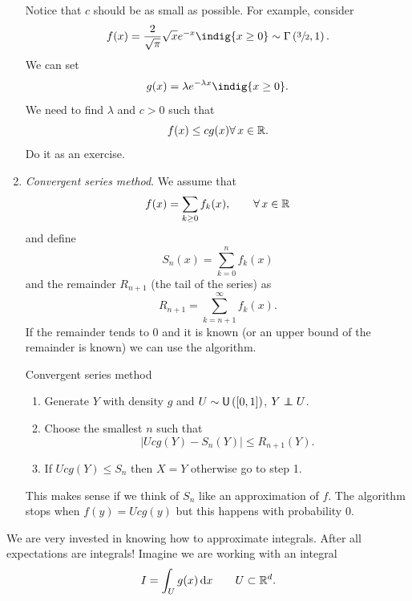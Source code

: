 \documentclass[12pt]{report}
\begin{document}
\begin{enumerate}[\circnum]
	Notice that $c$ should be as small as possible. For example, consider 
	\begin{equation*}
		f(x)=\frac{2}{\sqrt{\pi}}\sqrt{x}e^{-x}\indig{x\geq0}\sim\Gamma\left(\sfrac{3}{2},1\right).
	\end{equation*}
	We can set 
	\begin{equation*}
		g(x)=\lambda e^{-\lambda x}\indig{x\geq0}. 
	\end{equation*}
	We need to find $\lambda$ and $c>0$ such that 
	\begin{equation*}
		f(x)\leq cg(x) \forall\, x\in\mathbb{R}.
	\end{equation*}
	Do it as an exercise.
	\item \emph{Convergent series method}. We assume that 
	\begin{equation*}
		f(x)=\sum_{k\geq0}f_{k}(x),\qquad\forall\, x\in\mathbb{R}
	\end{equation*}
	and define
	\begin{equation*}
		S_{n}(x)=\sum_{k=0}^{n}f_{k}(x)
	\end{equation*}
	and the remainder $R_{n+1}$ (the tail of the series) as
	\begin{equation*}
		R_{n+1}=\sum_{k=n+1}^{\infty}f_{k}(x).
	\end{equation*}
	If the remainder tends to 0 and it is known (or an upper bound of the remainder is known) we can use the algorithm.
	\begin{algobox}{Convergent series method}
		\begin{enumerate}
			\item Generate $Y$ with density $g$ and $U\sim\mathsf{U}\left([0,1]\right)$, $Y\independent U$.
			\item Choose the smallest $n$ such that
			\begin{equation*}
				\left|Ucg(Y)-S_{n}(Y)\right|\leq R_{n+1}(Y).
			\end{equation*}
			\item If $Ucg(Y)\leq S_{n}$ then $X=Y$ otherwise go to step 1.
		\end{enumerate}
	\end{algobox}
	This makes sense if we think of $S_{n}$ like an approximation of $f$. The algorithm stops when $f(y)=Ucg(y)$ but this happens with probability 0.
\end{enumerate}
We are very invested in knowing how to approximate integrals. After all expectations are integrals! Imagine we are working with an integral
\begin{equation*}
	I=\int_{U}g(x)\mathop{}\!\mathrm{d} x\qquad U\subset\mathbb{R}^{d}.
\end{equation*}
\end{document}
